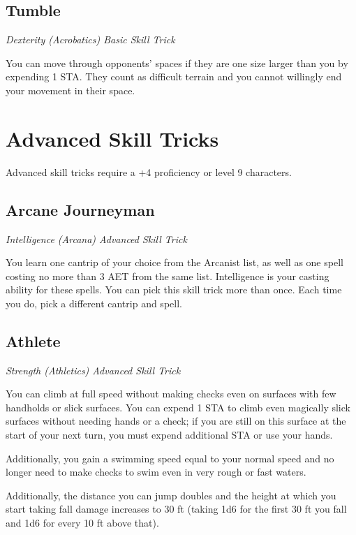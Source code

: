 \subsection{Tumble}\label{st:tumble}

\textit{Dexterity (Acrobatics) Basic Skill Trick}

You can move through opponents' spaces if they are one size larger than you by expending 1 STA. They count as difficult terrain and you cannot willingly end your movement in their space.

\section{Advanced Skill Tricks}
\label{sec:skill-tricks-advanced}

Advanced skill tricks require a +4 proficiency or level 9 characters.

\subsection{Arcane Journeyman}

\textit{Intelligence (Arcana) Advanced Skill Trick}

You learn one cantrip of your choice from the Arcanist list, as well as one spell costing no more than 3 AET from the same list. Intelligence is your casting ability for these spells. You can pick this skill trick more than once. Each time you do, pick a different cantrip and spell.

\subsection{Athlete}

\textit{Strength (Athletics) Advanced Skill Trick}

You can climb at full speed without making checks even on surfaces with few handholds or slick surfaces. You can expend 1 STA to climb even magically slick surfaces without needing hands or a check; if you are still on this surface at the start of your next turn, you must expend additional STA or use your hands.

Additionally, you gain a swimming speed equal to your normal speed and no longer need to make checks to swim even in very rough or fast waters.

Additionally, the distance you can jump doubles and the height at which you start taking fall damage increases to 30 ft (taking 1d6 for the first 30 ft you fall and 1d6 for every 10 ft above that).

